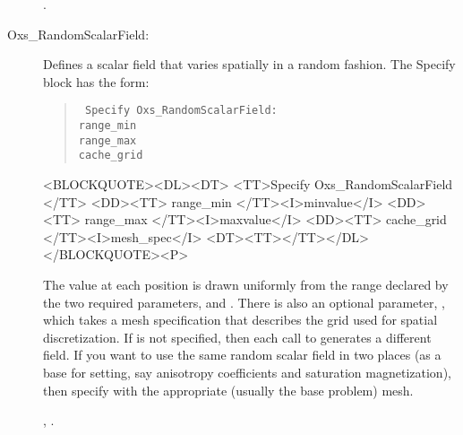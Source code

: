 \begin{description}
\begin{ExampleMifs}[Example]
  .
\end{ExampleMifs}

%
\item[Oxs\_RandomScalarField:]\label{item:RandomScalarField}
Defines a scalar field that varies spatially in a random fashion.
The Specify block has the form:
      \begin{latexonly}
      \begin{quote}\tt
      Specify Oxs\_RandomScalarField: \ocb\\
       \bi range\_min \\
       \bi range\_max \\
       \bi cache\_grid \\
      \ccb
      \end{quote}
      \end{latexonly}
      \begin{rawhtml}
      <BLOCKQUOTE><DL><DT>
      <TT>Specify Oxs_RandomScalarField {</TT>
      <DD><TT> range_min </TT><I>minvalue</I>
      <DD><TT> range_max </TT><I>maxvalue</I>
      <DD><TT> cache_grid </TT><I>mesh_spec</I>
      <DT><TT>}</TT></DL></BLOCKQUOTE><P>
      \end{rawhtml}
The value at each position is drawn uniformly from the range declared by
the two required parameters,  and
.  There is also an optional parameter,
, which takes a mesh specification that describes
the grid used for spatial discretization.  If
 is not specified, then each call to
 generates a different field.  If you want to
use the same random scalar field in two places (as a base for setting,
say anisotropy coefficients and saturation magnetization), then specify
 with the appropriate (usually the base problem)
mesh.

\begin{ExampleMifs}
  , .
\end{ExampleMifs}


\end{description}
